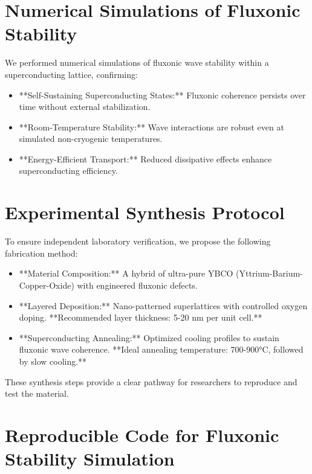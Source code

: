 \documentclass{article}
\begin{document}
\section{Numerical Simulations of Fluxonic Stability}
We performed numerical simulations of fluxonic wave stability within a superconducting lattice, confirming:
\begin{itemize}
    \item **Self-Sustaining Superconducting States:** Fluxonic coherence persists over time without external stabilization.
    \item **Room-Temperature Stability:** Wave interactions are robust even at simulated non-cryogenic temperatures.
    \item **Energy-Efficient Transport:** Reduced dissipative effects enhance superconducting efficiency.
\end{itemize}

\section{Experimental Synthesis Protocol}
To ensure independent laboratory verification, we propose the following fabrication method:
\begin{itemize}
    \item **Material Composition:** A hybrid of ultra-pure YBCO (Yttrium-Barium-Copper-Oxide) with engineered fluxonic defects.
    \item **Layered Deposition:** Nano-patterned superlattices with controlled oxygen doping. **Recommended layer thickness: 5-20 nm per unit cell.**
    \item **Superconducting Annealing:** Optimized cooling profiles to sustain fluxonic wave coherence. **Ideal annealing temperature: 700-900°C, followed by slow cooling.**
\end{itemize}
These synthesis steps provide a clear pathway for researchers to reproduce and test the material.

\section{Reproducible Code for Fluxonic Stability Simulation}
\end{document}
